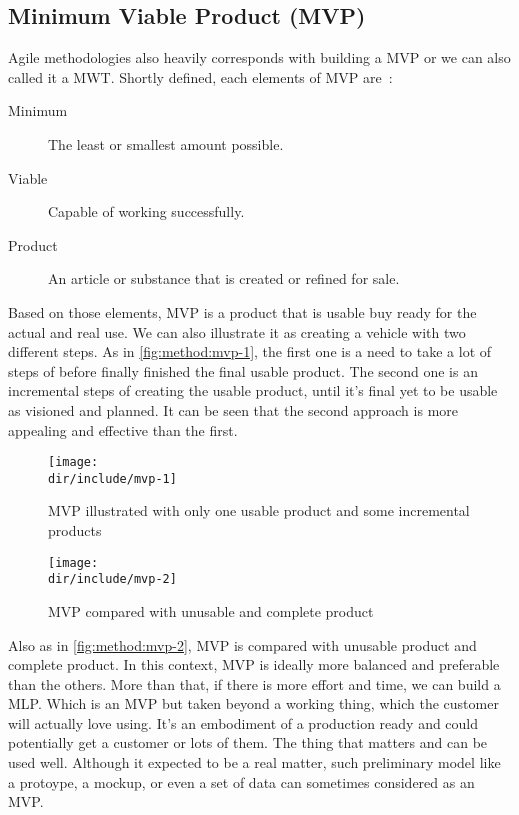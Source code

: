 \subsection{Minimum Viable Product (MVP)}

Agile methodologies also heavily corresponds with building a \ac{MVP} or we can also called it a \ac{MWT}. Shortly defined, each elements of \ac{MVP} are~\autocite{Montgomery2013MWT}:

\begin{description}
  \item[Minimum] The least or smallest amount possible.
  \item[Viable] Capable of working successfully.
  \item[Product] An article or substance that is created or refined for sale.
\end{description}

Based on those elements, \ac{MVP} is a product that is usable buy ready for the actual and real use.
We can also illustrate it as creating a vehicle with two different steps.
As in \autoref{fig:method:mvp-1}, the first one is a need to take a lot of steps of before finally finished the final usable product.
The second one is an incremental steps of creating the usable product, until it's final yet to be usable as visioned and planned.
It can be seen that the second approach is more appealing and effective than the first.

\begin{figure}[htb]
    \centering
    \texttt{[image: \\dir/include/mvp-1]}
    \caption[MVP illustrated]{MVP illustrated with only one usable product and some incremental products~\autocite{Mercury2014MVP}}
    \label{fig:method:mvp-1}
\end{figure}

\begin{figure}[htb]
    \centering
    \texttt{[image: \\dir/include/mvp-2]}
    \caption[MVP compared]{MVP compared with unusable and complete product~\autocite{Mercury2014MVP}}
    \label{fig:method:mvp-2}
\end{figure}

Also as in \autoref{fig:method:mvp-2}, \ac{MVP} is compared with unusable product and complete product.
In this context, \ac{MVP} is ideally more balanced and preferable than the others.
More than that, if there is more effort and time, we can build a \ac{MLP}.
Which is an \ac{MVP} but taken beyond a working thing, which the customer will actually love using.
It's an embodiment of a production ready and could potentially get a customer or lots of them.
The thing that matters and can be used well.
Although it expected to be a real matter, such preliminary model like a protoype, a mockup, or even a set of data can sometimes considered as an \ac{MVP}.
